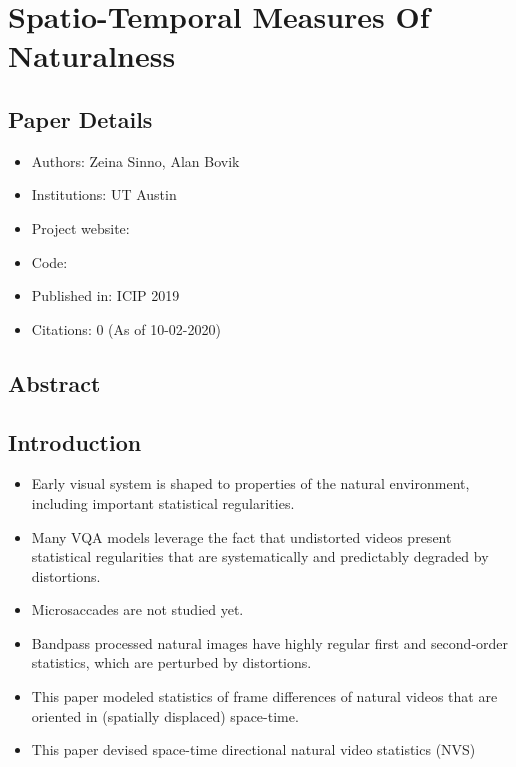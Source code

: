 \documentclass{article}
\begin{document}
    \section{Spatio-Temporal Measures Of Naturalness}\label{sec:Spatio_Temporal_Measures_Of_Naturalness}
    \subsection*{Paper Details}
    \begin{itemize}
        \item Authors: Zeina Sinno, Alan Bovik
        \item Institutions: UT Austin
        \item Project website:
        \item Code:
        \item Published in: ICIP 2019
        \item Citations: 0 (As of 10-02-2020)
    \end{itemize}

    \subsection*{Abstract}

    \subsection{Introduction}\label{subsec:Spatio_Temporal_Measures_Of_Naturalness:introduction}
    \begin{itemize}
        \item Early visual system is shaped to properties of the natural environment, including important statistical regularities.
        \item Many VQA models leverage the fact that undistorted videos present statistical regularities that are systematically and predictably degraded by distortions.
        \item Microsaccades are not studied yet.
        \item Bandpass processed natural images have highly regular first and second-order statistics, which are perturbed by distortions.
        \item This paper modeled statistics of frame differences of natural videos that are oriented in (spatially displaced) space-time.
        \item This paper devised space-time directional natural video statistics (NVS)
    \end{itemize}
\end{document}

